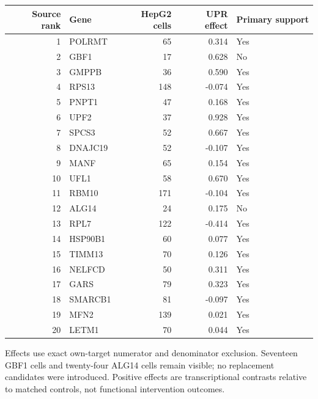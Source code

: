 \documentclass[a4paper,fleqn]{cas-sc}
\makeatletter
\DeclareRobustCommand{\rev}[1]{{\color{red}\def\@citecolor{black}\def\@linkcolor{red}\def\@urlcolor{red}#1}}
\makeatother
\begin{document}
\begin{center}
\begin{tabular}{rlrrl}
\toprule
\rev{Source rank} & \rev{Gene} & \rev{HepG2 cells} & \rev{UPR effect} & \rev{Primary support}\\
\midrule
\rev{1} & \rev{POLRMT} & \rev{65} & \rev{0.314} & \rev{Yes}\\
\rev{2} & \rev{GBF1} & \rev{17} & \rev{0.628} & \rev{No}\\
\rev{3} & \rev{GMPPB} & \rev{36} & \rev{0.590} & \rev{Yes}\\
\rev{4} & \rev{RPS13} & \rev{148} & \rev{-0.074} & \rev{Yes}\\
\rev{5} & \rev{PNPT1} & \rev{47} & \rev{0.168} & \rev{Yes}\\
\rev{6} & \rev{UPF2} & \rev{37} & \rev{0.928} & \rev{Yes}\\
\rev{7} & \rev{SPCS3} & \rev{52} & \rev{0.667} & \rev{Yes}\\
\rev{8} & \rev{DNAJC19} & \rev{52} & \rev{-0.107} & \rev{Yes}\\
\rev{9} & \rev{MANF} & \rev{65} & \rev{0.154} & \rev{Yes}\\
\rev{10} & \rev{UFL1} & \rev{58} & \rev{0.670} & \rev{Yes}\\
\rev{11} & \rev{RBM10} & \rev{171} & \rev{-0.104} & \rev{Yes}\\
\rev{12} & \rev{ALG14} & \rev{24} & \rev{0.175} & \rev{No}\\
\rev{13} & \rev{RPL7} & \rev{122} & \rev{-0.414} & \rev{Yes}\\
\rev{14} & \rev{HSP90B1} & \rev{60} & \rev{0.077} & \rev{Yes}\\
\rev{15} & \rev{TIMM13} & \rev{70} & \rev{0.126} & \rev{Yes}\\
\rev{16} & \rev{NELFCD} & \rev{50} & \rev{0.311} & \rev{Yes}\\
\rev{17} & \rev{GARS} & \rev{79} & \rev{0.323} & \rev{Yes}\\
\rev{18} & \rev{SMARCB1} & \rev{81} & \rev{-0.097} & \rev{Yes}\\
\rev{19} & \rev{MFN2} & \rev{139} & \rev{0.021} & \rev{Yes}\\
\rev{20} & \rev{LETM1} & \rev{70} & \rev{0.044} & \rev{Yes}\\
\bottomrule
\end{tabular}
\end{center}

\rev{Effects use exact own-target numerator and denominator exclusion.} \rev{Seventeen GBF1 cells and twenty-four ALG14 cells remain visible; no replacement candidates were introduced.} \rev{Positive effects are transcriptional contrasts relative to matched controls, not functional intervention outcomes.}
\end{document}
